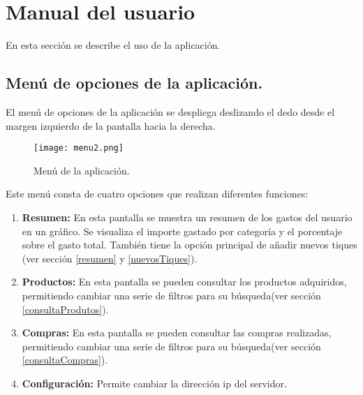 \cleardoublepage
\section{Manual del usuario}

En esta sección se describe el uso de la aplicación.

\subsection{Menú de opciones de la aplicación. \label{menu}}

El menú de opciones de la aplicación se despliega deslizando el dedo desde el margen izquierdo de la pantalla hacia la derecha.

\begin{figure}[ht]
\begin{center}
  \texttt{[image: menu2.png]}
  \caption{Menú de la aplicación.}\label{fig:menu}
\endminipage 
\end{center}
\end{figure}

Este menú consta de cuatro opciones que realizan diferentes funciones:
\begin{enumerate}
	\item \textbf{Resumen: }En esta pantalla se muestra un resumen de los gastos del usuario en un gráfico. Se visualiza el importe gastado por categoría y el porcentaje sobre el gasto total. También tiene la opción principal de añadir nuevos tiques (ver sección \ref{resumen} y \ref{nuevosTiques}).
	\item \textbf{Productos: }En esta pantalla se pueden consultar los productos adquiridos, permitiendo cambiar una serie de filtros para su búsqueda(ver sección \ref{consultaProdutos}).
	\item \textbf{Compras: }En esta pantalla se pueden consultar las compras realizadas, permitiendo cambiar una serie de filtros para su búsqueda(ver sección \ref{consultaCompras}).
	\item \textbf{Configuración: } Permite cambiar la dirección ip del servidor. 
\end{enumerate}


